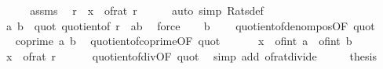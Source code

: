 \begin{isabellebody}
%
\isadelimproof
%
\endisadelimproof
%
\isatagproof
{}\isamarkupfalse%
\ {\isacharminus}{\kern0pt}\isanewline
\ \ \isamarkupfalse%
\ assms\ \isamarkupfalse%
\ r\ \ {\isachardoublequoteopen}x\ {\isacharequal}{\kern0pt}\ of{\isacharunderscore}{\kern0pt}rat\ r{\isachardoublequoteclose}\isanewline
\ \ \ \ \isamarkupfalse%
\ {\isacharparenleft}{\kern0pt}auto\ simp{\isacharcolon}{\kern0pt}\ Rats{\isacharunderscore}{\kern0pt}def{\isacharparenright}{\kern0pt}\isanewline
\ \ \isamarkupfalse%
\ a\ b\ \ quot{\isacharcolon}{\kern0pt}\ {\isachardoublequoteopen}quotient{\isacharunderscore}{\kern0pt}of\ r\ {\isacharequal}{\kern0pt}\ {\isacharparenleft}{\kern0pt}a{\isacharcomma}{\kern0pt}b{\isacharparenright}{\kern0pt}{\isachardoublequoteclose}\ \isamarkupfalse%
\ force\isanewline
\ \ \isamarkupfalse%
\ {\isachardoublequoteopen}b\ {\isachargreater}{\kern0pt}\ {}{\isachardoublequoteclose}\ \isamarkupfalse%
\ quotient{\isacharunderscore}{\kern0pt}of{\isacharunderscore}{\kern0pt}denom{\isacharunderscore}{\kern0pt}pos{\isacharbrackleft}{\kern0pt}OF\ quot{\isacharbrackright}{\kern0pt}\ \isacommand{{\isachardot}{\kern0pt}}\isamarkupfalse%
\isanewline
\ \ \isamarkupfalse%
\ \isamarkupfalse%
\ {\isachardoublequoteopen}coprime\ a\ b{\isachardoublequoteclose}\ \isamarkupfalse%
\ quotient{\isacharunderscore}{\kern0pt}of{\isacharunderscore}{\kern0pt}coprime{\isacharbrackleft}{\kern0pt}OF\ quot{\isacharbrackright}{\kern0pt}\ \isacommand{{\isachardot}{\kern0pt}}\isamarkupfalse%
\isanewline
\ \ \isamarkupfalse%
\ \isamarkupfalse%
\ {\isachardoublequoteopen}x\ {\isacharequal}{\kern0pt}\ of{\isacharunderscore}{\kern0pt}int\ a\ {\isacharslash}{\kern0pt}\ of{\isacharunderscore}{\kern0pt}int\ b{\isachardoublequoteclose}\ \isamarkupfalse%
\ {\isacartoucheopen}x\ {\isacharequal}{\kern0pt}\ of{\isacharunderscore}{\kern0pt}rat\ r{\isacartoucheclose}\isanewline
\ \ \ \ \ \ quotient{\isacharunderscore}{\kern0pt}of{\isacharunderscore}{\kern0pt}div{\isacharbrackleft}{\kern0pt}OF\ quot{\isacharbrackright}{\kern0pt}\ \isamarkupfalse%
\ {\isacharparenleft}{\kern0pt}simp\ add{\isacharcolon}{\kern0pt}\ of{\isacharunderscore}{\kern0pt}rat{\isacharunderscore}{\kern0pt}divide{\isacharparenright}{\kern0pt}\isanewline
\ \ \isamarkupfalse%
\ \isamarkupfalse%
\ {\isacharquery}{\kern0pt}thesis\ \isamarkupfalse%

\end{isabellebody}
